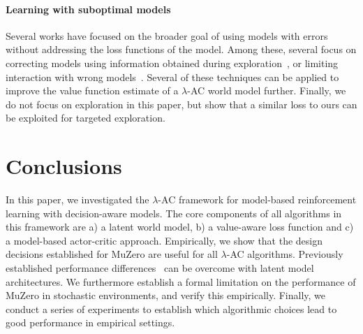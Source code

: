 

\paragraph{Learning with suboptimal models} Several works have focused on the broader goal of using models with errors without addressing the loss functions of the model.
Among these, several focus on correcting models using information obtained during exploration~\parencite{joseph2013reinforcement,talvitie2017self,modi2020sample,rakhsha2022operator}, or limiting interaction with wrong models~\parencite{buckman2018sample,mbpo,pmlr-v119-abbas20a}.
Several of these techniques can  be applied to improve the value function estimate of a $\lambda$-AC world model further.
Finally, we do not focus on exploration in this paper, but \textcite{guo2022byolexplore} show that a similar loss to ours can be exploited for targeted exploration.

\section{Conclusions}

In this paper, we investigated the $\lambda$-AC framework for model-based reinforcement learning with decision-aware models.
The core components of all algorithms in this framework are a) a latent world model, b) a value-aware loss function and c) a model-based actor-critic approach. 
Empirically, we show that the design decisions established for MuZero are useful for all $\lambda$-AC algorithms.
Previously established performance differences~\parencite{lovatto2020decision,voelcker2022value} can be overcome with latent model architectures.
We furthermore establish a formal limitation on the performance of MuZero in stochastic environments, and verify this empirically.
Finally, we conduct a series of experiments to establish which algorithmic choices lead to good performance in empirical settings.


